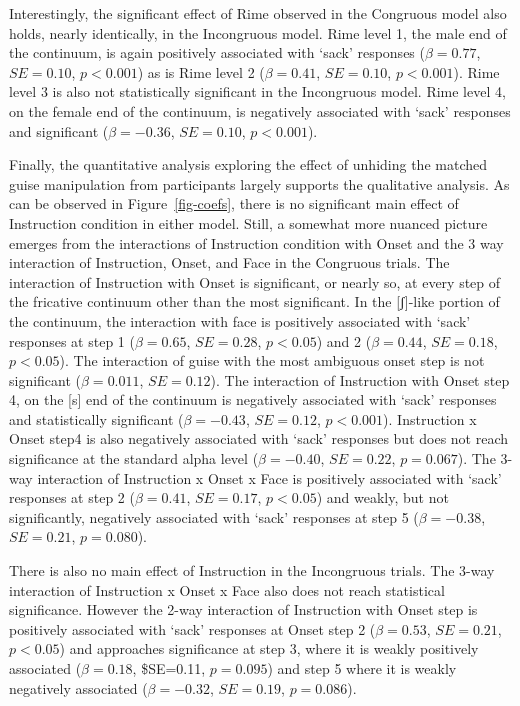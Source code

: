 \documentclass[
  letterpaper,
  DIV=11,
  numbers=noendperiod]{scrartcl}
\begin{document}
Interestingly, the significant effect of Rime observed in the Congruous
model also holds, nearly identically, in the Incongruous model. Rime
level 1, the male end of the continuum, is again positively associated
with `sack' responses (\(β=0.77\), \(SE=0.10\), \(p < 0.001\)) as is
Rime level 2 (\(β=0.41\), \(SE=0.10\), \(p < 0.001\)). Rime level 3 is
also not statistically significant in the Incongruous model. Rime level
4, on the female end of the continuum, is negatively associated with
`sack' responses and significant (\(β=-0.36\), \(SE=0.10\),
\(p < 0.001\)).

Finally, the quantitative analysis exploring the effect of unhiding the
matched guise manipulation from participants largely supports the
qualitative analysis. As can be observed in Figure~\ref{fig-coefs},
there is no significant main effect of Instruction condition in either
model. Still, a somewhat more nuanced picture emerges from the
interactions of Instruction condition with Onset and the 3 way
interaction of Instruction, Onset, and Face in the Congruous trials. The
interaction of Instruction with Onset is significant, or nearly so, at
every step of the fricative continuum other than the most significant.
In the {[}ʃ{]}-like portion of the continuum, the interaction with face
is positively associated with `sack' responses at step 1 (\(β=0.65\),
\(SE=0.28\), \(p < 0.05\)) and 2 (\(β=0.44\), \(SE=0.18\),
\(p < 0.05\)). The interaction of guise with the most ambiguous onset
step is not significant (\(β=0.011\), \(SE=0.12\)). The interaction of
Instruction with Onset step 4, on the {[}s{]} end of the continuum is
negatively associated with `sack' responses and statistically
significant (\(β=-0.43\), \(SE=0.12\), \(p < 0.001\)). Instruction x
Onset step4 is also negatively associated with `sack' responses but does
not reach significance at the standard alpha level (\(β=-0.40\),
\(SE=0.22\), \(p = 0.067\)). The 3-way interaction of Instruction x
Onset x Face is positively associated with `sack' responses at step 2
(\(β=0.41\), \(SE=0.17\), \(p < 0.05\)) and weakly, but not
significantly, negatively associated with `sack' responses at step 5
(\(β=-0.38\), \(SE=0.21\), \(p = 0.080\)).

There is also no main effect of Instruction in the Incongruous trials.
The 3-way interaction of Instruction x Onset x Face also does not reach
statistical significance. However the 2-way interaction of Instruction
with Onset step is positively associated with `sack' responses at Onset
step 2 (\(β=0.53\), \(SE=0.21\), \(p < 0.05\)) and approaches
significance at step 3, where it is weakly positively associated
(\(β=0.18\), \$SE=0.11, \(p = 0.095\)) and step 5 where it is weakly
negatively associated (\(β=-0.32\), \(SE=0.19\), \(p = 0.086\)).
\end{document}
